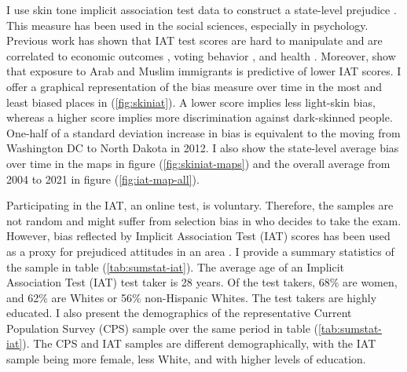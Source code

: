 \documentclass[12pt, fullpage]{article}
\begin{document}

I use skin tone implicit association test data to construct a state-level prejudice \citep{greenwaldMeasuringIndividualDifferences1998}. This measure has been used in the social sciences, especially in psychology. Previous work has shown that IAT test scores are hard to manipulate \citep{egloffPredictiveValidityImplicit2002} and are correlated to economic outcomes \citep{chettyRaceEconomicOpportunity2020,gloverDiscriminationSelfFulfillingProphecy2017}, voting behavior \citep{friesePredictingVotingBehavior2007}, and health \citep{leitnerRacialBiasAssociated2016}. Moreover, \citet{bursztynImmigrantNextDoor2022} show that exposure to Arab and Muslim immigrants is predictive of lower IAT scores. I offer a graphical representation of the bias measure over time in the most and least biased places in (\ref{fig:skiniat}). A lower score implies less light-skin bias, whereas a higher score implies more discrimination against dark-skinned people. One-half of a standard deviation increase in bias is equivalent to the moving from Washington DC to North Dakota in 2012. I also show the state-level average bias over time in the maps in figure (\ref{fig:skiniat-maps}) and the overall average from 2004 to 2021 in figure (\ref{fig:iat-map-all}).

Participating in the IAT, an online test, is voluntary. Therefore, the samples are not random and might suffer from selection bias in who decides to take the exam. However,  bias reflected by Implicit Association Test (IAT) scores has been used as a proxy for prejudiced attitudes in an area \citet{chettyRaceEconomicOpportunity2020}. I provide a summary statistics of the sample in table (\ref{tab:sumstat-iat}). The average age of an Implicit Association Test (IAT) test taker is 28 years. Of the test takers, 68\% are women, and 62\% are Whites or 56\% non-Hispanic Whites. The test takers are highly educated. I also present the demographics of the representative Current Population Survey (CPS) sample over the same period in table (\ref{tab:sumstat-iat}). The CPS and IAT samples are different demographically, with the IAT sample being more female, less White, and with higher levels of education.
\end{document}
